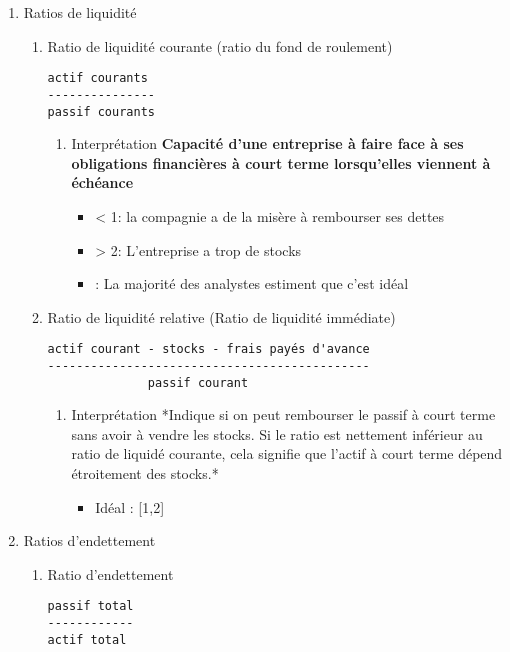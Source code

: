 \documentclass[11pt]{article}
\begin{document}
\begin{enumerate}
\item Ratios de liquidité
\label{sec:org395282c}
\begin{enumerate}
\item Ratio de liquidité courante (ratio du fond de roulement)
\label{sec:org009079d}
\begin{verbatim}
actif courants
---------------
passif courants
\end{verbatim}
\begin{enumerate}
\item Interprétation
\label{sec:orgdf7b951}
\textbf{Capacité d'une entreprise à faire face à ses obligations financières à court
terme lorsqu'elles viennent à échéance}
\begin{itemize}
\item < 1: la compagnie a de la misère à rembourser ses dettes
\item > 2: L'entreprise a trop de stocks
\item\relax [1.2, 2.0] : La majorité des analystes estiment que c'est idéal
\end{itemize}
\end{enumerate}
\item Ratio de liquidité relative (Ratio de liquidité immédiate)
\label{sec:orgd733b77}
\begin{verbatim}
actif courant - stocks - frais payés d'avance
---------------------------------------------
              passif courant
\end{verbatim}
\begin{enumerate}
\item Interprétation
\label{sec:org72e710f}
*Indique si on peut rembourser le passif à court terme sans avoir à vendre les
stocks. Si le ratio est nettement inférieur au ratio de liquidé courante, cela
signifie que l'actif à court terme dépend étroitement des stocks.*
\begin{itemize}
\item Idéal : [1,2]
\end{itemize}
\end{enumerate}
\end{enumerate}
\item Ratios d'endettement
\label{sec:orgee7a5ee}
\begin{enumerate}
\item Ratio d'endettement
\label{sec:org3080583}
\begin{verbatim}
passif total
------------
actif total
\end{verbatim}

\end{enumerate}
\end{enumerate}
\end{document}

